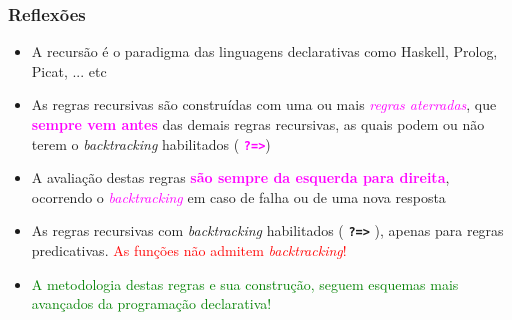 \begin{frame}[fragile]
\frametitle{Reflexões}


\begin{itemize}
\item A recursão é o paradigma das linguagens declarativas como Haskell, Prolog, Picat, ... etc
 
 \pause
 \item As regras recursivas são construídas com uma ou mais  \textcolor{magenta}{\textit{regras aterradas}}, que  \textcolor{magenta}{\textbf{sempre vem antes}} das demais
 regras recursivas, as  quais podem ou não terem o \textit{backtracking} habilitados ( \textcolor{magenta}{\textbf{\texttt{?=>}}})
 
 
 \pause
 \item A avaliação destas regras \textcolor{magenta}{\textbf{são sempre da esquerda para direita}}, ocorrendo o \textcolor{magenta}{\textit{backtracking}} em caso de falha ou de uma nova resposta
  
  \pause
 \item As regras recursivas com \textit{backtracking} habilitados ( \textbf{\texttt{?=>}} ), apenas
 para regras predicativas.  \textcolor{red}{As funções não admitem \textit{backtracking}!}
 
  \pause
 \item \textcolor{green}{A metodologia destas regras e sua construção, seguem  esquemas mais
 avançados da programação declarativa!}
 
 
 
\end{itemize}

\end{frame}
